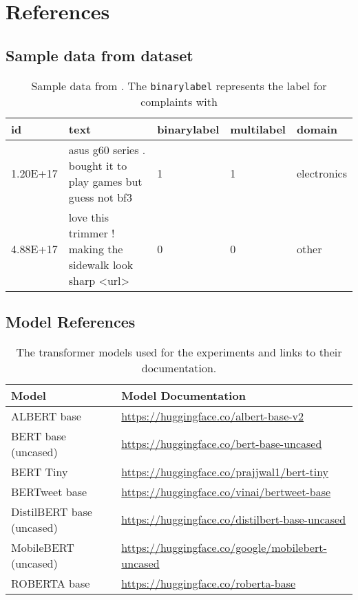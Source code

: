 \chapter{References}

\section{Sample data from dataset}
\begin{table}[ht]
    \captionsetup{font=small}
    \centering
    \begin{tabularx}{\textwidth}{|l|X|}
        \hline
        \textbf{id}  & \textbf{text} & \textbf{binarylabel}& \textbf{multilabel}& \textbf{domain}\\
        \hline
        1.20E+17  & asus g60 series . bought it to play games but guess not bf3 & 1 & 1 & electronics \\
        \hline        
        4.88E+17 & love this trimmer ! making the sidewalk look sharp <url> & 0 & 0 & other \\
        \hline
    \end{tabularx}
    \caption{Sample data from \cite{jinModelingSeverityComplaints2021}. The \texttt{binarylabel} represents the label for complaints with}    
    \label{tab: apdx_sample_data}
\end{table}

\section{Model References}

\begin{table}[ht]
    \captionsetup{font=small}
    \centering
    \begin{tabularx}{\textwidth}{|l|X|}
        \hline
        \rowcolor[gray]{0.7}
        \textbf{Model}  & \textbf{Model Documentation} \\
        \hline

        ALBERT base  & \small{\url{https://huggingface.co/albert-base-v2}} \\
        \hline        
        BERT base (uncased)  & \small{\url{https://huggingface.co/bert-base-uncased}} \\
        \hline
        BERT Tiny  & \small{\url{https://huggingface.co/prajjwal1/bert-tiny}} \\
        \hline        
        BERTweet base  & \small{\url{https://huggingface.co/vinai/bertweet-base}} \\
        \hline
        DistilBERT base (uncased)  & \small{\url{https://huggingface.co/distilbert-base-uncased}} \\
        \hline
        MobileBERT (uncased) & \small{\url{https://huggingface.co/google/mobilebert-uncased}} \\
        \hline
        ROBERTA base & \small{\url{https://huggingface.co/roberta-base}} \\
        \hline 
    \end{tabularx}
    \caption{The transformer models used for the experiments and links to their documentation.}    
    \label{tab: apdx_model_doc}
\end{table}
